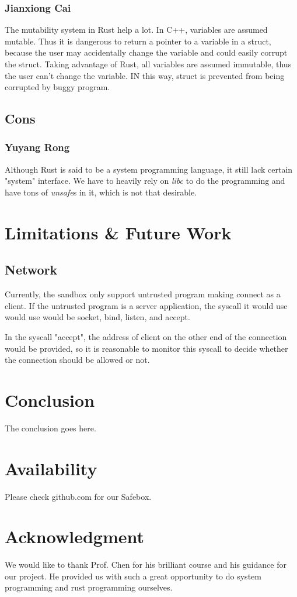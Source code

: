 \documentclass[conference,compsoc]{IEEEtran}
\begin{document}
		\subsubsection{Jianxiong Cai}
			The mutability system in Rust help a lot. In C++, variables are assumed mutable. Thus it is dangerous to return a pointer to a variable in a struct, because the user may accidentally change the variable and could easily corrupt the struct.
			Taking advantage of Rust, all variables are assumed immutable, thus the user can't change the variable. IN this way, struct is prevented from being corrupted by buggy program.
	\subsection{Cons}
		\subsubsection{Yuyang Rong}
			\par
				Although Rust is said to be a system programming language, it still lack certain "system" interface.
				We have to heavily rely on \emph{libc} to do the programming and have tons of \emph{unsafe}s in it, which is not that desirable. 				

\section{Limitations \& Future Work}
	\subsection{Network}
		Currently, the sandbox only support untrusted program making connect as a client. If the untrusted program is a server application, the syscall it would use would use would be socket, bind, listen, and accept. 
		\par
		In the syscall "accept", the address of client on the other end of the connection would be provided, so it is reasonable to monitor this syscall to decide whether the connection should be allowed or not.


\section{Conclusion}

	The conclusion goes here.

\section{Availability}

	Please check github.com for our Safebox.

\section*{Acknowledgment}
	We would like to thank Prof. Chen for his brilliant course and his guidance for our project. He provided us with such a great opportunity to do system programming and rust programming ourselves. 






\end{document}
